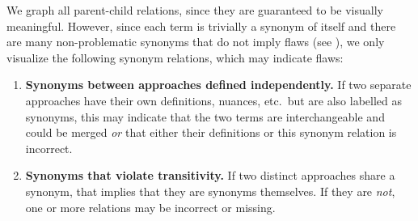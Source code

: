     
    \ExampleParChdGraphs{}

    \clearpage\fi
{}\label{relevantSyns}
We graph all parent-child relations, since they are guaranteed to be visually
meaningful.
However, since each term is trivially a synonym of itself and there are many
non-problematic synonyms that do not imply flaws (see ),
we only visualize the following synonym relations, which may indicate flaws:

\begin{enumerate}

    \item%
          \textbf{Synonyms between approaches defined independently.}\hfill\break
          If two separate approaches have their own definitions, nuances,
          etc.~but are also labelled as synonyms, this may indicate that the
          two terms are interchangeable and could be merged \emph{or} that
          either their definitions or this synonym relation is incorrect.

    \item%
          \textbf{Synonyms that violate transitivity.}\hfill\break
          If two distinct approaches share a synonym, that implies that they
          are synonyms themselves. If they are \emph{not}, one or more
          relations may be incorrect or missing.
\end{enumerate}
